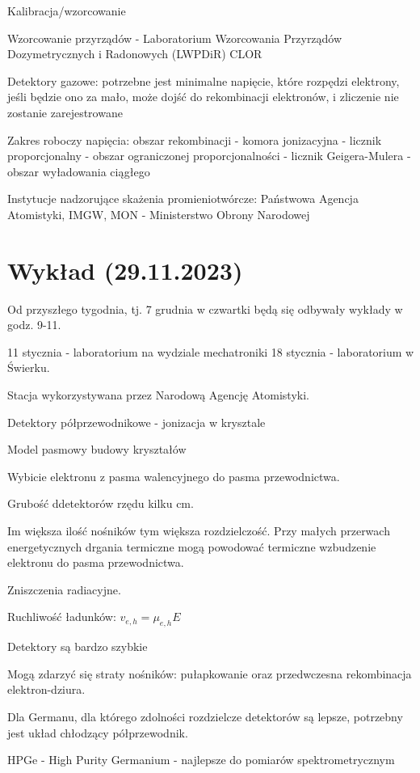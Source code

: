 \documentclass{article}
\begin{document}
Kalibracja\slash wzorcowanie

Wzorcowanie przyrządów - Laboratorium Wzorcowania Przyrządów Dozymetrycznych i Radonowych (LWPDiR) CLOR

Detektory gazowe: potrzebne jest minimalne napięcie, które rozpędzi elektrony, jeśli będzie ono za mało, może dojść do rekombinacji elektronów, i zliczenie nie zostanie zarejestrowane

Zakres roboczy napięcia: obszar rekombinacji - komora jonizacyjna - licznik proporcjonalny - obszar ograniczonej proporcjonalności - licznik Geigera-Mulera - obszar wyładowania ciągłego

Instytucje nadzorujące skażenia promieniotwórcze: Państwowa Agencja Atomistyki, IMGW, MON - Ministerstwo Obrony Narodowej

\section{Wykład (29.11.2023)}

Od przyszłego tygodnia, tj. 7 grudnia w czwartki będą się odbywały wykłady w godz. 9-11.

11 stycznia - laboratorium na wydziale mechatroniki
18 stycznia - laboratorium w Świerku.

Stacja wykorzystywana przez Narodową Agencję Atomistyki.

Detektory półprzewodnikowe - jonizacja w krysztale

Model pasmowy budowy kryształów

Wybicie elektronu z pasma walencyjnego do pasma przewodnictwa.

Grubość ddetektorów rzędu kilku cm.

Im większa ilość nośników tym większa rozdzielczość. Przy małych przerwach energetycznych drgania termiczne mogą powodować termiczne wzbudzenie elektronu do pasma przewodnictwa.

Zniszczenia radiacyjne.

Ruchliwość ładunków: $v_{e,h} = \mu_{e,h} E$

Detektory są bardzo szybkie

Mogą zdarzyć się straty nośników: pułapkowanie oraz przedwczesna rekombinacja elektron-dziura.

Dla Germanu, dla którego zdolności rozdzielcze detektorów są lepsze, potrzebny jest układ chłodzący półprzewodnik.

HPGe - High Purity Germanium - najlepsze do pomiarów spektrometrycznym
\end{document}
